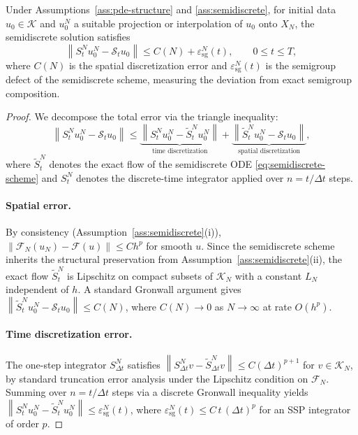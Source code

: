 \documentclass[hidelinks,review,nohypdvips,onefignum,onetabnum]{siamart220329}
\newcommand{\cS}{\mathcal{S}}
\newcommand{\cK}{\mathcal{K}}
\newcommand{\cF}{\mathcal{F}}
\newcommand{\cFN}{\mathcal{F}_N}
\newcommand{\norm}[1]{\left\lVert #1 \right\rVert}
\begin{document}
\begin{proposition}\label{prop:semidiscrete-conv}
Under Assumptions~\ref{ass:pde-structure} and \ref{ass:semidiscrete}, for initial data $u_0\in \cK$ and $u_0^N$ a suitable projection or interpolation of $u_0$ onto $X_N$, the semidiscrete solution satisfies
\begin{equation}\label{eq:semidiscrete-conv}
\norm{S_t^N u_0^N - \cS_tu_0}\le C(N)+\varepsilon_{\mathrm{sg}}^N(t), \qquad 0\le t\le T,
\end{equation}
where $C(N)$ is the spatial discretization error and $\varepsilon_{\mathrm{sg}}^N(t)$ is the semigroup defect of the semidiscrete scheme, measuring the deviation from exact semigroup composition.
\end{proposition}

\begin{proof}
We decompose the total error via the triangle inequality:
\begin{equation*}
\norm{S_t^N u_0^N - \cS_tu_0} \le \underbrace{\norm{S_t^N u_0^N - \tilde S_t^N u_0^N}}_{\text{time discretization}} + \underbrace{\norm{\tilde S_t^N u_0^N - \cS_tu_0}}_{\text{spatial discretization}},
\end{equation*}
where $\tilde S_t^N$ denotes the exact flow of the semidiscrete ODE \eqref{eq:semidiscrete-scheme} and $S_t^N$ denotes the discrete-time integrator applied over $n=t/\Delta t$ steps.

\paragraph{Spatial error.} By consistency (Assumption~\ref{ass:semidiscrete}(i)), $\norm{\cFN(u_N)-\cF(u)}\le C h^p$ for smooth $u$. Since the semidiscrete scheme inherits the structural preservation from Assumption~\ref{ass:semidiscrete}(ii), the exact flow $\tilde S_t^N$ is Lipschitz on compact subsets of $\cK_N$ with a constant $L_N$ independent of $h$. A standard Gronwall argument gives $\norm{\tilde S_t^N u_0^N - \cS_tu_0}\le C(N)$, where $C(N)\to 0$ as $N\to\infty$ at rate $O(h^p)$.

\paragraph{Time discretization error.} The one-step integrator $S_{\Delta t}^N$ satisfies $\norm{S_{\Delta t}^N v - \tilde S_{\Delta t}^N v}\le C(\Delta t)^{p+1}$ for $v\in\cK_N$, by standard truncation error analysis under the Lipschitz condition on $\cFN$. Summing over $n=t/\Delta t$ steps via a discrete Gronwall inequality yields $\norm{S_t^N u_0^N - \tilde S_t^N u_0^N}\le \varepsilon_{\mathrm{sg}}^N(t)$, where $\varepsilon_{\mathrm{sg}}^N(t)\le C\,t\,(\Delta t)^p$ for an SSP integrator of order $p$.
\end{proof}
\end{document}
